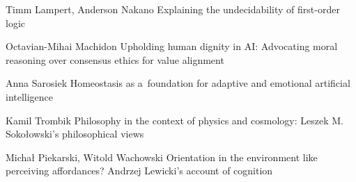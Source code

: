 
\begin{tocitem}
{Timm Lampert, Anderson Nakano}
{Explaining the undecidability of first-order logic}

\end{tocitem}

\begin{tocitem}
{Octavian-Mihai Machidon}
{Upholding human dignity in AI: Advocating moral reasoning over consensus ethics for value alignment}

\end{tocitem}

\begin{tocitem}
{Anna Sarosiek}
{Homeostasis as a~foundation for adaptive and emotional artificial intelligence}

\end{tocitem}

\begin{tocitem}
{Kamil Trombik}
{Philosophy in the context of physics and cosmology: Leszek M. Sokołowski's philosophical views}

\end{tocitem}

\begin{tocitem}
{Michał Piekarski, Witold Wachowski}
{Orientation in the environment like perceiving affordances? Andrzej Lewicki's account of cognition}

\end{tocitem}

